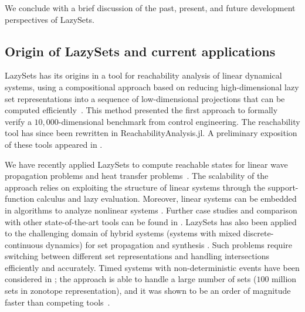 We conclude with a brief discussion of the past, present, and future development perspectives of LazySets.

\subsection{Origin of LazySets and current applications}

LazySets has its origins in a tool for reachability analysis of linear dynamical systems, using a compositional approach based on reducing high-dimensional lazy set representations into a sequence of low-dimensional projections that can be computed efficiently~\cite{BogomolovFFVPS18}.
%
This method presented the first approach to formally verify a $10{,}000$-dimensional benchmark from control engineering.
%
The reachability tool has since been rewritten in ReachabilityAnalysis.jl.
%
A preliminary exposition of these tools appeared in \cite{BogomolovFFPS19}.

\smallskip

We have recently applied LazySets to compute reachable states for linear wave propagation problems and heat transfer problems~\cite{forets2021combining}.
%
The scalability of the approach relies on exploiting the structure of linear systems through the support-function calculus and lazy evaluation.
%
Moreover, linear systems can be embedded in algorithms to analyze nonlinear systems \cite{forets2021reachability}.
%
Further case studies and comparison with other state-of-the-art tools can be found in \cite{ARCHCOMP20LINEAR, ARCHCOMP20NONLINEAR}.
%
LazySets has also been applied to the challenging domain of hybrid systems (systems with mixed discrete-continuous dynamics) for set propagation \cite{bogomolov2020reachability} and synthesis \cite{soto2021synthesis}.
%
Such problems require switching between different set representations and handling intersections efficiently and accurately.
%
Timed systems with non-deterministic events have been considered in \cite{forets2020efficient}; the approach is able to handle a large number of sets ($100$ million sets in zonotope representation), and it was shown to be an order of magnitude faster than competing tools~\cite{ARCHCOMP20LINEAR}.

\smallskip

